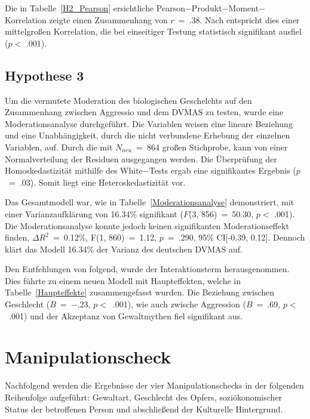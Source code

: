 Die in Tabelle~\ref{H2_Pearson} ersichtliche Pearson$-$Produkt$-$Moment$-$Korrelation zeigte einen Zusammenhang von $r$~=~.38. Nach \textcite{Cohen_1992} entspricht dies einer mittelgroßen Korrelation, die bei einseitiger Testung statistisch signifikant ausfiel ($p<$ .001).



\subsection{Hypothese 3}    \label{subsec_4.2.3}
Um die vermutete Moderation des biologischen Geschelchts auf den Zusammenhang zwischen Aggressio und dem DVMAS zu testen, wurde eine Moderationsanalyse durchgeführt. Die Variablen weisen eine lineare Beziehung und eine Unabhängigkeit, durch die nicht verbundene Erhebung der einzelnen Variablen, auf. Durch die mit $N_{neu}$~=~864 großen Stichprobe, kann von einer Normalverteilung der Residuen ausgegangen werden. Die Überprüfung der Homoskedastizität mithilfe des White$-$Tests ergab eine signifikantes Ergebnis ($p$~=~.03). Somit liegt eine Heteroskedastizität vor. 


Das Gesamtmodell war, wie in Tabelle~\ref{Moderationsanalyse} demonstriert, mit einer Varianzaufklärung von 16.34\% signifikant ($F$(3, 856)~=~50.30, $p<$ .001). Die Moderationsanalyse konnte jedoch keinen signifikanten Moderationseffekt finden, $\Delta R^{2}$~=~0.12\%, F(1, 860)~=~1.12, $p$~=~.290, 95\% CI[-0.39, 0.12]. Dennoch klärt das Modell 16.34\% der Varianz des deutschen DVMAS auf.


Den Entfehlungen von \textcite{Moderation_SPSS} folgend, wurde der Interaktionsterm herausgenommen. Dies führte zu einem neuen Modell mit Haupteffekten, welche in Tabelle~\ref{Haupteffekte} zusammengefasst wurden. Die Beziehung zwischen Geschlecht ($B$~=~$-$.23, $p<$~.001), wie auch zwische Aggression ($B$~=~.69, $p<$~.001) und der Akzeptanz von Gewaltmythen fiel signifikant aus. 


\section{Manipulationscheck}    \label{sec_4.3}
Nachfolgend werden die Ergebnisse der vier Manipulationschecks in der folgenden Reihenfolge aufgeführt: Gewaltart, Geschlecht des Opfers, soziökonomischer Status der betroffenen Person und abschließend der Kulturelle Hintergrund.


